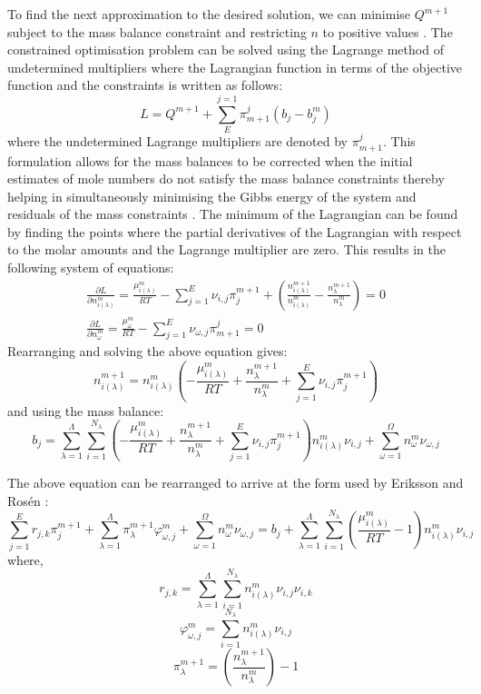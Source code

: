 	 To find the next approximation to the desired solution, we can minimise $Q^{m+1}$ subject to the mass balance constraint and restricting $n$ to positive values \cite{White:58}. The constrained optimisation problem can be solved using the Lagrange method of undetermined multipliers \cite{Nocedal06} where the Lagrangian function in terms of the objective function and the constraints is written as follows:
	 \begin{equation}
	 	L = Q^{m+1} + \sum_{E}^{j=1} \pi_{m+1}^{j}\left( b_j - b_j^{m}\right)
	 \end{equation}
	 where the undetermined Lagrange multipliers are denoted by $\pi_{m+1}^{j}$. This formulation allows for the mass balances to be corrected when the initial estimates of mole numbers do not satisfy the mass balance constraints thereby helping in simultaneously minimising the Gibbs energy of the system and residuals of the mass constraints \cite{Piro11b}. The minimum of the Lagrangian can be found by finding the points where the partial derivatives of the Lagrangian with respect to the molar amounts and the Lagrange multiplier are zero. This results in the following system of equations:
	 \begin{gather}
			\frac{\partial L}{\partial n_{i(\lambda)}^{m}} = \frac{\mu_{i(\lambda)}^{m}}{RT} - \sum_{j=1}^{E} \nu_{i,j} \pi_j^{m+1} + \left(\frac{n_{i(\lambda)}^{m+1}}{n_{i(\lambda)}^{m}} - \frac{n_{\lambda}^{m+1}}{n_{\lambda}^{m}}\right) = 0\\
			\frac{\partial L}{\partial n_{\omega}^{m}} = \frac{\mu_{\omega}^{m}}{RT} - \sum_{j=1}^{E} \nu_{\omega,j}\pi_{m+1}^{j} = 0
	\end{gather}
	Rearranging and solving the above equation gives:
	\begin{equation}
			n_{i(\lambda)}^{m+1} = n_{i(\lambda)}^{m} \left( -\frac{\mu_{i(\lambda)}^{m}}{RT} +  \frac{n_{\lambda}^{m+1}}{n_{\lambda}^{m}} + \sum_{j=1}^{E} \nu_{i,j} \pi_j^{m+1} \right)
	\end{equation}
	 and using the mass balance:
	 \begin{equation}
			b_j = \sum_{\lambda=1}^{\Lambda} \sum_{i=1}^{N_\lambda} \left( -\frac{\mu_{i(\lambda)}^{m}}{RT} +  \frac{n_{\lambda}^{m+1}}{n_{\lambda}^{m}} + \sum_{j=1}^{E} \nu_{i,j} \pi_j^{m+1} \right)n_{i(\lambda)}^{m} \nu_{i,j} + \sum_{\omega=1}^{\Omega}n_{\omega}^{m} \nu_{\omega,j} 
	\end{equation}
	
	The above equation can be rearranged to arrive at the form used by Eriksson and Ros\'en \cite{Eriksson73}:
	\begin{equation}\label{eq:GEM1}
		\sum_{j=1}^{E} r_{j,k}\pi_{j}^{m+1} + \sum_{\lambda=1}^{\Lambda}\pi_{\lambda}^{m+1} \varphi_{\omega,j}^{m} + \sum_{\omega=1}^{\Omega}n_{\omega}^{m} \nu_{\omega,j} 
		= b_j + \sum_{\lambda=1}^{\Lambda} \sum_{i=1}^{N_\lambda} \left( \frac{\mu_{i(\lambda)}^{m}}{RT} -1 \right)n_{i(\lambda)}^{m} \nu_{i,j}
	\end{equation}
	where, $$r_{j,k} = \sum_{\lambda=1}^{\Lambda} \sum_{i=1}^{N_\lambda} n_{i(\lambda)}^{m} \nu_{i,j}\nu_{i,k}$$ $$\varphi_{\omega,j}^{m} = \sum_{i=1}^{N_\lambda} n_{i(\lambda)}^{m} \nu_{i,j}$$ $$\pi_{\lambda}^{m+1} = \left(\frac{n_{\lambda}^{m+1}}{n_{\lambda}^{m}}\right) -1$$
	
